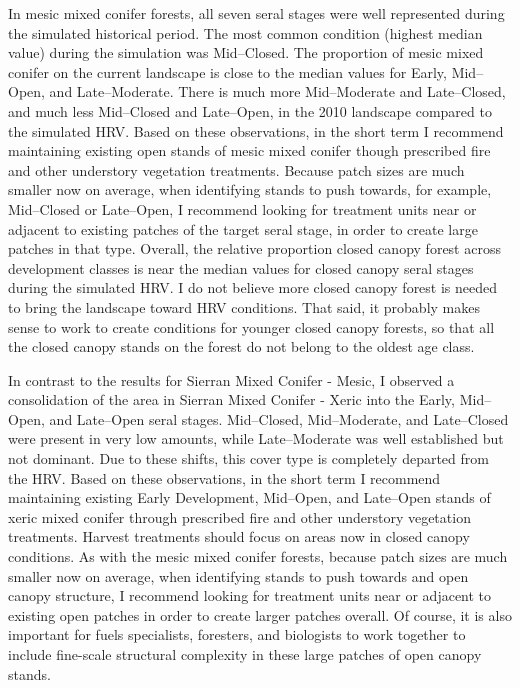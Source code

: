 In mesic mixed conifer forests, all seven seral stages were well represented during the simulated historical period. The most common condition (highest median value) during the simulation was Mid--Closed. The proportion of mesic mixed conifer on the current landscape is close to the median values for Early, Mid--Open, and Late--Moderate. There is much more Mid--Moderate and Late--Closed, and much less Mid--Closed and Late--Open, in the 2010 landscape compared to the simulated HRV. Based on these observations, in the short term I recommend maintaining existing open stands of mesic mixed conifer though prescribed fire and other understory vegetation treatments. Because patch sizes are much smaller now on average, when identifying stands to push towards, for example, Mid--Closed or Late--Open, I recommend looking for treatment units near or adjacent to existing patches of the target seral stage, in order to create large patches in that type. Overall, the relative proportion closed canopy forest across development classes is near the median values for closed canopy seral stages during the simulated HRV. I do not believe more closed canopy forest is needed to bring the landscape toward HRV conditions. That said, it probably makes sense to work to create conditions for younger closed canopy forests, so that all the closed canopy stands on the forest do not belong to the oldest age class.

In contrast to the results for Sierran Mixed Conifer - Mesic, I observed a consolidation of the area in Sierran Mixed Conifer - Xeric into the Early, Mid--Open, and Late--Open seral stages. Mid--Closed, Mid--Moderate, and Late--Closed were present in very low amounts, while Late--Moderate was well established but not dominant. Due to these shifts, this cover type is completely departed from the HRV. Based on these observations, in the short term I recommend maintaining existing Early Development, Mid--Open, and Late--Open stands of xeric mixed conifer through prescribed fire and other understory vegetation treatments. Harvest treatments should focus on areas now in closed canopy conditions. As with the mesic mixed conifer forests, because patch sizes are much smaller now on average, when identifying stands to push towards and open canopy structure, I recommend looking for treatment units near or adjacent to existing open patches in order to create larger patches overall. Of course, it is also important for fuels specialists, foresters, and biologists to work together to include fine-scale structural complexity in these large patches of open canopy stands.
 
